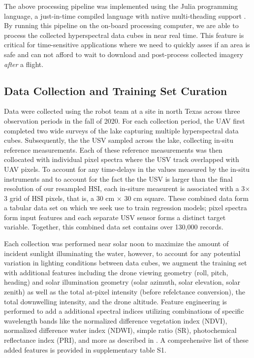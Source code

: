 \documentclass[journal,article,submit,pdftex,moreauthors]{Definitions/mdpi}
\begin{document}
The above processing pipeline was implemented using the Julia programming language, a just-in-time compiled language with native multi-theading support \cite{julia-1}. By running this pipeline on the on-board processing computer, we are able to process the collected hyperspectral data cubes in near real time. This feature is critical for time-sensitive applications where we need to quickly asses if an area is safe and can not afford to wait to download and post-process collected imagery \textit{after} a flight.

\subsection{Data Collection and Training Set Curation}

Data were collected using the robot team at a site in north Texas across three observation periods in the fall of 2020. For each collection period, the UAV first completed two wide surveys of the lake capturing multiple hyperspectral data cubes. Subsequently, the the USV sampled across the lake, collecting in-situ reference measurements. Each of these reference measurements was then collocated with individual pixel spectra where the USV track overlapped with UAV pixels. To account for any time-delays in the values measured by the in-situ instruments and to account for the fact the the USV is larger than the final resolution of our resampled HSI, each in-siture measurent is associated with a 3$\times$3 grid of HSI pixels, that is, a 30 cm $\times$ 30 cm square. These combined data form a tabular data set on which we seek use to train regression models; pixel spectra form input features and each separate USV sensor forms a distinct target variable. Together, this combined data set contains over 130,000 records.

Each collection was performed near solar noon to maximize the amount of incident sunlight illuminating the water, however, to account for any potential variation in lighting conditions between data cubes, we augment the training set with additional features including the drone viewing geometry (roll, pitch, heading) and solar illumination geometry (solar azimuth, solar elevation, solar zenith) as well as the total at-pixel intensity (before refelctance conversion), the total downwelling intensity, and the drone altitude. Feature engineering is performed to add a additional spectral indices utilizing combinations of specific wavelength bands like the normalized difference vegetation index (NDVI), normalized difference water index (NDWI), simple ratio (SR), photochemical reflectance index (PRI), and more as described in \cite{envi_vegetation_indices, thenkabail2018hyperspectral,kaufman1992atmospherically, SpectralIndexWheat}. A comprehensive list of these added features is provided in supplementary table S1.
\end{document}
